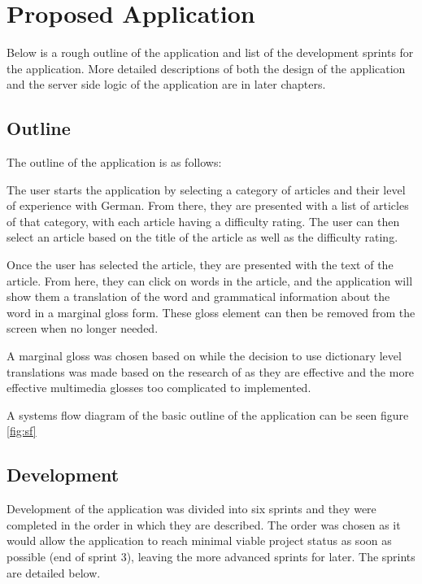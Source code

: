 \chapter{Proposed Application}

Below is a rough outline of the application and list of the development sprints for the application. More detailed descriptions of both the design of the application and the server side logic of the application are in later chapters. 

\section{Outline}

The outline of the application is as follows: 

The user starts the application by selecting a category of articles and their level of experience with German. From there, they are presented with a list of articles of that category, with each article having a difficulty rating. The user can then select an article based on the title of the article as well as the difficulty rating.

Once the user has selected the article, they are presented with the text of the article. From here, they can click on words in the article, and the application will show them a translation of the word and grammatical information about the word in a marginal gloss form. These gloss element can then be removed from the screen when no longer needed.

A marginal gloss was chosen based on \textcite{abuseileek2008} while the decision to use dictionary level translations was made based on the research of \textcite{gettys2001} as they are effective and the more effective multimedia glosses too complicated to implemented.

A systems flow diagram of the basic outline of the application can be seen figure \ref{fig:sf}



\section{Development}

Development of the application was divided into six sprints and they were completed in the order in which they are described. The order was chosen as it would allow the application to reach minimal viable project status as soon as possible (end of sprint 3), leaving the more advanced sprints for later. The sprints are detailed below.

